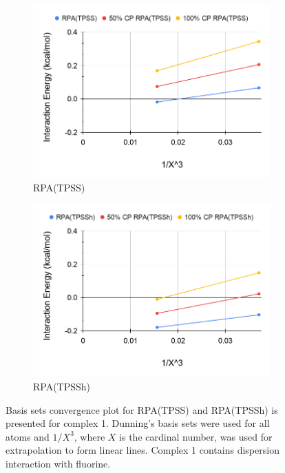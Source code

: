 \documentclass[11pt]{article}
\begin{document}
\begin{figure}[H]
  \centering
  \begin{subfigure}{.5\textwidth}
    \centering
    \includegraphics[scale=0.3]{tpss-1.png}
    \caption{RPA(TPSS)}
    \label{fig:tpss_1}
  \end{subfigure}%
  \begin{subfigure}{.5\textwidth}
    \centering
    \includegraphics[scale=0.3]{tpssh-1.png}
    \caption{RPA(TPSSh)}
    \label{fig:tpssh_1}
  \end{subfigure}
  \caption{Basis sets convergence plot for RPA(TPSS) and RPA(TPSSh) is
    presented for complex 1. Dunning's basis sets were used for all atoms
    and $1/X^3$, where $X$ is the cardinal number, was used for
    extrapolation to form linear lines. Complex 1 contains dispersion
    interaction with fluorine.}
  \label{fig:complex_1}
\end{figure}
\end{document}
